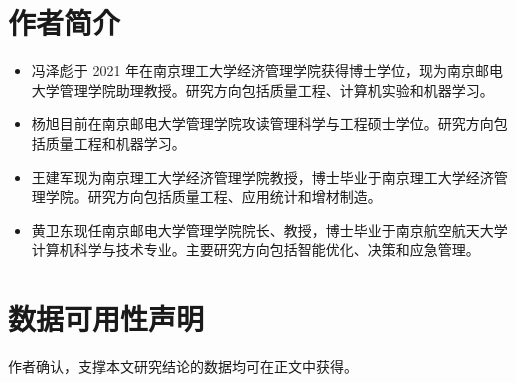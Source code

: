 \documentclass[]{interact}
\theoremstyle{plain}%
\theoremstyle{definition}
\theoremstyle{remark}
\begin{document}
\section*{作者简介}
\begin{itemize}
 \item 冯泽彪于 2021 年在南京理工大学经济管理学院获得博士学位，现为南京邮电大学管理学院助理教授。研究方向包括质量工程、计算机实验和机器学习。

 \item 杨旭目前在南京邮电大学管理学院攻读管理科学与工程硕士学位。研究方向包括质量工程和机器学习。
 
 \item 王建军现为南京理工大学经济管理学院教授，博士毕业于南京理工大学经济管理学院。研究方向包括质量工程、应用统计和增材制造。

 \item 黄卫东现任南京邮电大学管理学院院长、教授，博士毕业于南京航空航天大学计算机科学与技术专业。主要研究方向包括智能优化、决策和应急管理。
\end{itemize}

\section*{数据可用性声明}

作者确认，支撑本文研究结论的数据均可在正文中获得。
\end{document}
